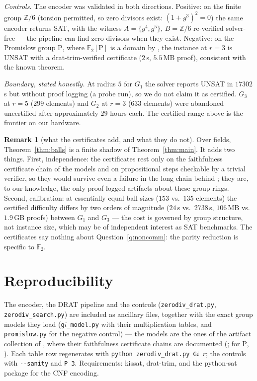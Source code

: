\documentclass[11pt]{amsart}
\theoremstyle{definition}
\newtheorem{remark}[theorem]{Remark}
\newcommand{\GOne}{G_1}
\newcommand{\GTwo}{G_2}
\newcommand{\GThree}{G_3}
\renewcommand{\P}{\mathrm{P}}
\newcommand{\Z}{\mathbb{Z}}
\newcommand{\F}{\mathbb{F}}
\begin{document}
\medskip
\noindent\emph{Controls.} The encoder was validated in both directions.
Positive: on the finite group $\Z/6$ (torsion permitted, so zero divisors
exist: $(1+g^3)^2=0$) the same encoder returns SAT, with the witness
$A=\{g^4,g^5\}$, $B=\Z/6$ re-verified solver-free --- the pipeline can find
zero divisors when they exist. Negative: on the Promislow group $\P$, where
$\F_2[\P]$ is a domain by \cite{Formanek}, the instance at $r=3$ is UNSAT
with a \textsf{drat-trim}-verified certificate ($2$\,s, $5.5$\,MB proof),
consistent with the known theorem.

\medskip
\noindent\emph{Boundary, stated honestly.} At radius $5$ for $\GOne$ the
solver reports UNSAT in $17302$\,s but without proof logging (a probe run),
so we do not claim it as certified. $\GThree$ at $r=5$ ($299$ elements) and
$\GTwo$ at $r=3$ ($633$ elements) were abandoned uncertified after
approximately $29$ hours each. The certified range above is the frontier on
our hardware.

\begin{remark}[what the certificates add, and what they do not]
Over fields, Theorem~\ref{thm:balls} is a finite shadow of
Theorem~\ref{thm:main}. It adds two things. First, independence: the
certificates rest only on the faithfulness certificate chain of the models
\cite{companion,companionP} and on propositional steps checkable by a
trivial verifier, so they would survive even a failure in the long chain
behind \cite{KLM}; they are, to our knowledge, the only proof-logged
artifacts about these group rings. Second, calibration: at essentially
equal ball sizes ($153$ vs.\ $135$ elements) the certified difficulty
differs by two orders of magnitude ($24$\,s vs.\ $2738$\,s, $106$\,MB vs.\
$1.9$\,GB proofs) between $\GOne$ and $\GThree$ --- the cost is governed by
group structure, not instance size, which may be of independent interest as
SAT benchmarks. The certificates say nothing about
Question~\ref{q:noncomm}: the parity reduction is specific to $\F_2$.
\end{remark}

\section*{Reproducibility}
The encoder, the DRAT pipeline and the controls
(\texttt{zerodiv\_drat.py}, \texttt{zerodiv\_search.py}) are included as
ancillary files, together with the exact group models they load
(\texttt{g$i$\_model.py} with their multiplication tables, and
\texttt{promislow.py} for the negative control) --- the models are the ones
of the artifact collection of \cite{companion}, where their faithfulness
certificate chains are documented (\cite[\S2]{companion};
for $\P$, \cite{companionP}). Each table row regenerates with
\texttt{python zerodiv\_drat.py G$i$ $r$}; the controls with
\texttt{-{}-sanity} and \texttt{P 3}. Requirements: \textsf{kissat},
\textsf{drat-trim}, and the \textsf{python-sat} package for the CNF
encoding.
\end{document}
